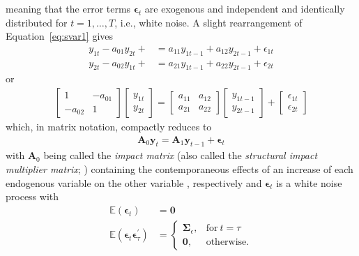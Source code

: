 \documentclass[a4paper,11pt,listof=nochaptergap,oneside,pointednumbers,bibtotoc,bigheadings,liststotoc,hidelinks]{scrbook}
\theoremstyle{mysatz}
\theoremstyle{mydefinition}
\theoremstyle{mytheorem}
\theoremstyle{mybemerkung}
\newcommand{\vect}[1]{\boldsymbol{\mathbf{#1}}}
\begin{document}
meaning that the error terms $\vect{\epsilon}_t$ are exogenous and independent and identically distributed  for $t = 1, \dots, T$, i.e., white noise. A slight rearrangement of Equation~\ref{eq:svar1} gives 
\begin{equation} \label{eq:svar2}
\begin{split}
	y_{1t} - a_{01}y_{2t} + & = a_{11}y_{1t-1} + a_{12}y_{2t-1} + \epsilon_{1t} \\
	y_{2t} - a_{02}y_{1t} +  & = a_{21}y_{1t-1} + a_{22}y_{2t-1} + \epsilon_{2t}
\end{split}								
\end{equation}
or 
\begin{equation} \label{eq:svar3}
\begin{split}
	\begin{bmatrix}
    	1 & -a_{01} \\
    	-a_{02} & 1
 	\end{bmatrix}
	\begin{bmatrix}
    	y_{1t} \\
    	y_{2t}
 	\end{bmatrix} = 
	\begin{bmatrix}
    	a_{11} & a_{12} \\
    	a_{21} & a_{22}
 	\end{bmatrix} 
	\begin{bmatrix}
    	y_{1t-1} \\
    	y_{2t-1}
 	\end{bmatrix} +
	\begin{bmatrix}
    	\epsilon_{1t} \\
    	\epsilon_{2t}
 	\end{bmatrix} 
\end{split}								
\end{equation}
which, in matrix notation, compactly reduces to 
\begin{equation} \label{eq:svar4}
\begin{split}
	\vect{A}_0\vect{y}_t = \vect{A}_1\vect{y}_{t-1} + \vect{\epsilon}_t
\end{split}								
\end{equation}
with $\vect{A}_0$ being called the \textit{impact matrix} (also called the \textit{structural impact multiplier matrix}; \citealp{lutkepohlkilian:17}) containing the contemporaneous effects of an increase of each endogenous variable on the other variable \citep{lutkepohlkilian:17}, respectively and $\vect{\epsilon}_t$ is a white noise process with
\begin{equation}
\begin{split}
	\mathbb{E}(\vect{\epsilon}_t) &  = \vect{0}  \\
	\mathbb{E}(\vect{\epsilon}_t\vect{\epsilon}_{\tau}^') & =     \begin{cases}
      												\vect{\Sigma}_\epsilon, & \text{for}\ t = \tau \\
      												\vect{0}, & \text{otherwise.}
   								  \end{cases}
\end{split}								
\end{equation}
\end{document}
